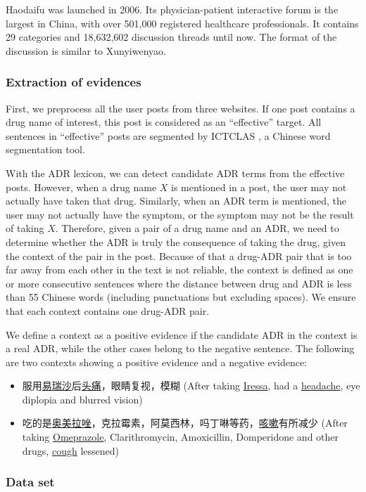 Haodaifu was launched in 2006. Its physician-patient interactive forum is 
the largest in China, with over 501,000 registered healthcare professionals. 
It contains 29 categories and 18,632,602 discussion threads until now. 
The format of the discussion is similar to Xunyiwenyao.

\subsubsection{Extraction of evidences}
\label{subsubsec:2.2.3} 
First, we preprocess all the user posts from three websites. If one post contains a drug name of interest, this post is considered as an ``effective'' target. All sentences in ``effective'' posts are segmented by ICTCLAS \citep{zhang2003hhmm}, a Chinese word segmentation tool.

With the ADR lexicon, we can detect candidate ADR terms from the effective posts. However, when a drug name $X$ is mentioned in a post, the user may not actually have taken that drug. Similarly, when an ADR term is mentioned, the user may not actually have the symptom, or the symptom may not be the result of taking $X$. Therefore, given a pair of a drug name and an ADR, we need to determine whether the ADR is truly the consequence of taking the drug, given the context of the pair in the post. Because of that a drug-ADR pair that is too far away from each other in the text is not reliable, the context is defined as one or more consecutive sentences where the distance between drug and ADR is less than 55 Chinese words (including punctuations but excluding spaces). We ensure that each context contains one drug-ADR pair.

We define a context as a positive evidence if the candidate ADR in the context is a real ADR, while the other cases belong to the negative sentence. The following are two contexts showing a positive evidence and a negative evidence:

\begin{itemize}
	\item 服用\uline{易瑞沙}后\uline{头痛}，眼睛复视，模糊 (After taking \uline{Iressa}, had a \uline{headache}, eye diplopia and blurred vision)
	\item 吃的是\uline{奥美拉唑}，克拉霉素，阿莫西林，吗丁啉等药，\uline{咳嗽}有所减少 (After taking \uline{Omeprazole}, Clarithromycin, Amoxicillin, Domperidone and other drugs, \uline{cough} lessened) 
\end{itemize}

\subsubsection{Data set}
\label{subsubsec:2.2.4} 

